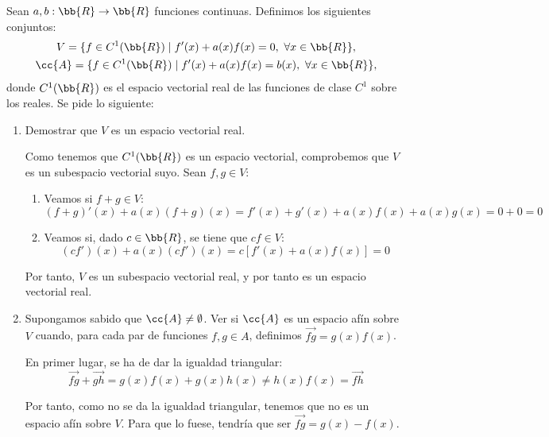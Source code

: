 \begin{ejercicio}
    Sean $a, b : \bb{R} \to \bb{R}$ funciones continuas. Definimos los siguientes conjuntos:
    \begin{gather*}
        V = \{ f \in C^1(\bb{R}) \mid f'(x) + a(x)f(x) = 0, ~\forall x \in \bb{R}\},\\
        \cc{A} = \{ f \in C^1(\bb{R}) \mid f'(x) + a(x)f(x) = b(x), ~\forall x \in \bb{R}\},
    \end{gather*}
    donde $C^1(\bb{R})$ es el espacio vectorial real de las funciones de clase $C^1$ sobre los reales. Se pide lo siguiente:
    \begin{enumerate}
        \item Demostrar que $V$ es un espacio vectorial real.

        Como tenemos que $C^1(\bb{R})$ es un espacio vectorial, comprobemos que $V$ es un subespacio vectorial suyo. Sean $f,g\in V$:
        \begin{enumerate}
            \item Veamos si $f+g\in V$:
            \begin{equation*}
                (f+g)'(x) + a(x)(f+g)(x)=f'(x)+g'(x)+a(x)f(x)+a(x)g(x)=0+0=0
            \end{equation*}
            
            \item Veamos si, dado $c\in \bb{R}$, se tiene que $cf\in V$:
            \begin{equation*}
                (cf')(x) + a(x)(cf')(x)=c[f'(x) + a(x)f(x)]=0
            \end{equation*}
        \end{enumerate}
        Por tanto, $V$ es un subespacio vectorial real, y por tanto es un espacio vectorial real.

        
        \item Supongamos sabido que $\cc{A} \neq \emptyset$. Ver si $\cc{A}$ es un espacio afín sobre $V$ cuando, para cada par de funciones $f, g \in A$, definimos $\vec{fg} = g(x)f(x)$.

        En primer lugar, se ha de dar la igualdad triangular:
        \begin{equation*}
            \vec{fg} + \vec{gh} = g(x)f(x)+g(x)h(x) \neq h(x)f(x) = \vec{fh}
        \end{equation*}

        Por tanto, como no se da la igualdad triangular, tenemos que no es un espacio afín sobre $V$. Para que lo fuese, tendría que ser $\vec{fg} = g(x)-f(x)$.
    \end{enumerate}
\end{ejercicio}


